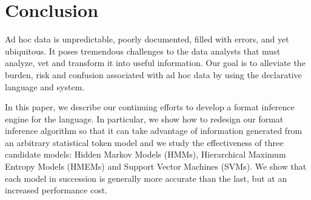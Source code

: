 \section{Conclusion}\label{sec:conclude}

Ad hoc data is unpredictable, poorly documented, filled with errors, 
and yet ubiquitous.  It poses tremendous challenges to the data analysts
that must analyze, vet and transform it into useful information.
Our goal is to alleviate the burden, risk and confusion associated 
with ad hoc data by using the declarative \pads{} language and system.

In this paper, we describe our 
continuing efforts to develop a format inference engine for 
the \pads{} language. In particular, 
we show how to redesign our format inference algorithm
so that it can take advantage of information 
generated from an arbitrary statistical token model and we
study the effectiveness of three candidate models:
Hidden Markov Models (HMMs), Hierarchical Maximum Entropy Models
(HMEMs) and Support Vector Machines (SVMs).
We show that each model in succession is generally more
accurate than the last, but at an increased performance cost.
